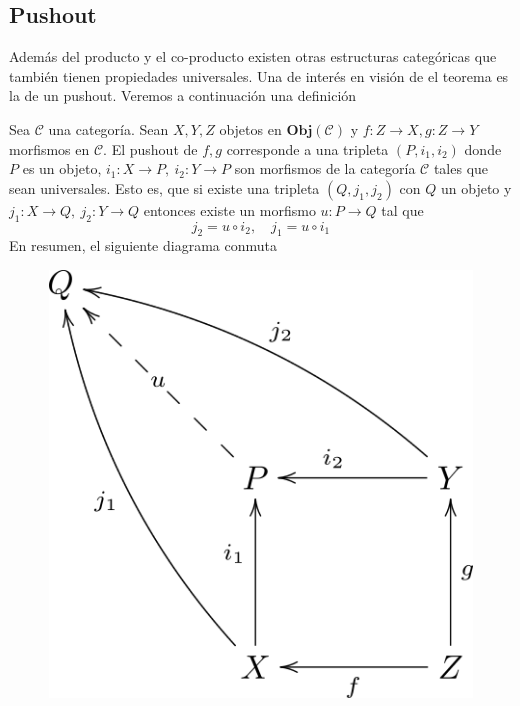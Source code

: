 \subsection{Pushout}
Además del producto y el co-producto existen otras estructuras
categóricas que también tienen propiedades universales. Una de interés
en visión de el teorema \vank es la de un pushout. Veremos a
continuación una definición
\begin{definicion}[Pushout]
Sea \(\mathscr{C}\) una categoría. Sean \(X,Y,Z\) objetos en
\(\mathbf{Obj}(\mathscr{C})\) y \(f : Z \to X , g : Z \to Y\) morfismos
en \(\mathscr{C}\). El pushout de \(f,g\) corresponde a una tripleta
\((P, i_1, i_2)\) donde \(P\) es un objeto, \(i_1 : X \to P ,\ i_2 : Y
\to P\) son morfismos de la categoría \(\mathscr{C}\) tales que sean
universales. Esto es, que si existe una tripleta \((Q, j_1, j_2)\) con
\(Q\) un objeto y \(j_1 : X \to Q,\ j_2 : Y \to Q\) entonces existe un
morfismo \(u : P \to Q\) tal que
\[ j_2 = u \circ i_2,\quad j_1 = u \circ i_1 \]
En resumen, el siguiente diagrama conmuta
\begin{figure}[h]
    \centering \includegraphics[scale=1]{./imagenes/pushout.png}
\end{figure}
\end{definicion}

